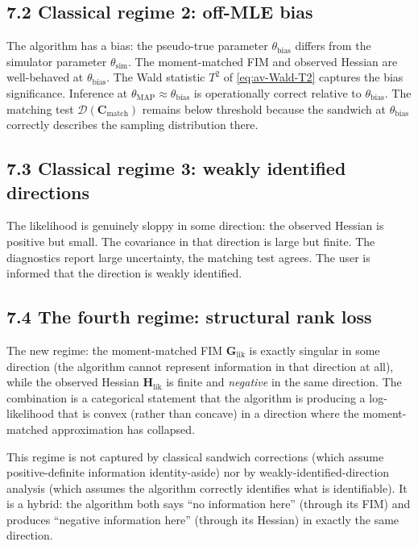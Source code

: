 \documentclass[11pt]{article}
\begin{document}
\subsection*{7.2 Classical regime 2: off-MLE bias}

The algorithm has a bias: the pseudo-true parameter $\theta_{\mathrm{bias}}$
differs from the simulator parameter $\theta_{\mathrm{sim}}$. The
moment-matched FIM and observed Hessian are well-behaved at
$\theta_{\mathrm{bias}}$. The Wald statistic $T^2$ of
\eqref{eq:av-Wald-T2} captures the bias significance. Inference at
$\theta_{\mathrm{MAP}} \approx \theta_{\mathrm{bias}}$ is
operationally correct relative to $\theta_{\mathrm{bias}}$. The
matching test $\mathcal D(\mathbf C_{\mathrm{match}})$ remains below
threshold because the sandwich at $\theta_{\mathrm{bias}}$ correctly
describes the sampling distribution there.

\subsection*{7.3 Classical regime 3: weakly identified directions}

The likelihood is genuinely sloppy in some direction: the observed
Hessian is positive but small. The covariance in that direction is
large but finite. The diagnostics report large uncertainty, the
matching test agrees. The user is informed that the direction is
weakly identified.

\subsection*{7.4 The fourth regime: structural rank loss}

The new regime: the moment-matched FIM $\mathbf G_{\mathrm{lik}}$ is
exactly singular in some direction (the algorithm cannot represent
information in that direction at all), while the observed Hessian
$\mathbf H_{\mathrm{lik}}$ is finite and \emph{negative} in the same
direction. The combination is a categorical statement that the
algorithm is producing a log-likelihood that is convex (rather than
concave) in a direction where the moment-matched approximation has
collapsed.

This regime is not captured by classical sandwich corrections
(which assume positive-definite information identity-aside) nor by
weakly-identified-direction analysis (which assumes the algorithm
correctly identifies what is identifiable). It is a hybrid: the
algorithm both says ``no information here'' (through its FIM) and
produces ``negative information here'' (through its Hessian) in
exactly the same direction.
\end{document}
